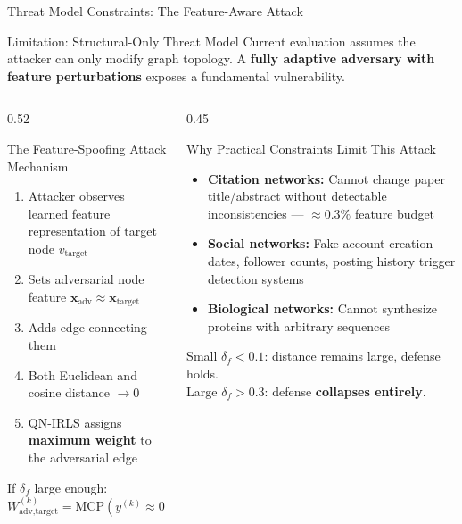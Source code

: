 \documentclass[aspectratio=169]{beamer}
\begin{document}
\begin{frame}{Threat Model Constraints: The Feature-Aware Attack}
  \tiny
  \begin{block}{Limitation: Structural-Only Threat Model}
    Current evaluation assumes the attacker can only modify graph topology. A \textbf{fully adaptive adversary with feature perturbations} exposes a fundamental vulnerability.
  \end{block}
  \vspace{4pt}
  \begin{columns}[T]
    \begin{column}{0.52\textwidth}
      \begin{alertblock}{The Feature-Spoofing Attack Mechanism}
        \begin{enumerate}
          \item Attacker observes learned feature representation of target node $v_\text{target}$
          \item Sets adversarial node feature $\mathbf{x}_\text{adv} \approx \mathbf{x}_\text{target}$
          \item Adds edge connecting them
          \item Both Euclidean and cosine distance $\to 0$
          \item QN-IRLS assigns \textbf{maximum weight} to the adversarial edge
        \end{enumerate}
        If $\delta_f$ large enough: $W^{(k)}_\text{adv,target} = \text{MCP}(y^{(k)} \approx 0) \to 1$
      \end{alertblock}
    \end{column}
    \begin{column}{0.45\textwidth}
      \begin{block}{Why Practical Constraints Limit This Attack}
        \begin{itemize}
          \item \textbf{Citation networks:} Cannot change paper title/abstract without detectable inconsistencies --- $\approx 0.3\%$ feature budget
          \item \textbf{Social networks:} Fake account creation dates, follower counts, posting history trigger detection systems
          \item \textbf{Biological networks:} Cannot synthesize proteins with arbitrary sequences
        \end{itemize}
        \vspace{4pt}
        Small $\delta_f < 0.1$: distance remains large, defense holds.\\
        Large $\delta_f > 0.3$: defense \textbf{collapses entirely}.
      \end{block}
    \end{column}
  \end{columns}
\end{frame}
\end{document}
